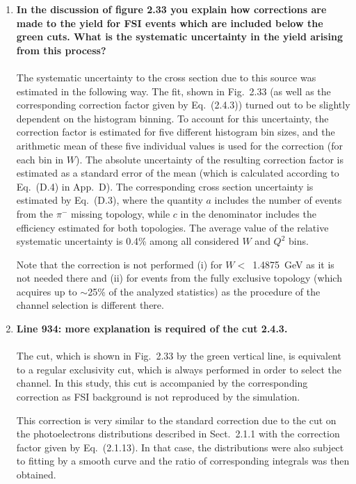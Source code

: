 \documentclass[,superscriptaddress,showpacs,amssymb,amsmath,amsfonts,linenumbers,article]{revtex4-1}
\begin{document}
\begin{enumerate}[label=\textbf{\arabic*}.]
\item {\bf In the discussion of figure 2.33 you explain how corrections are made to the yield for FSI events which are included below the green cuts. What is the systematic uncertainty in the yield arising from this process?}\\ \\
The systematic uncertainty to the cross section due to this source was estimated in the following way. The fit, shown in Fig.~2.33 (as well as the corresponding correction factor given by Eq.~(2.4.3)) turned out to be slightly dependent on the histogram binning. To account for this uncertainty, the correction factor is estimated for five different histogram bin sizes, and the arithmetic mean of these five individual values is used for the correction (for each bin in $W$). The absolute uncertainty of the resulting correction factor is estimated as a standard error of the mean (which is calculated according to Eq.~(D.4) in App.~D). The corresponding cross section uncertainty is estimated by Eq.~(D.3), where the quantity $a$ includes the number of events from the $\pi^{-}$ missing topology, while $c$ in the denominator includes the efficiency estimated for both topologies. The average value of the relative systematic uncertainty is 0.4\% among all considered $W$ and $Q^{2}$ bins.

Note that the correction is not performed (i) for $W<$~1.4875~GeV as it is not needed there and (ii) for events from the fully exclusive topology (which acquires up to $\sim$25\% of the analyzed statistics) as the procedure of the channel selection is different there. 

\item {\bf Line 934: more explanation is required of the cut 2.4.3.}\\ \\
The cut, which is shown in Fig.~2.33 by the green vertical line, is equivalent to a regular exclusivity cut, which is always performed in order to select the channel. In this study, this cut is accompanied by the corresponding correction as FSI background is not reproduced by the simulation.


This correction is very similar to the standard correction due to the cut on the photoelectrons distributions described in Sect.~2.1.1 with the correction factor given by Eq.~(2.1.13). In that case, the distributions were also subject to fitting by a smooth curve and the ratio of corresponding integrals was then obtained. 


\end{enumerate}
\end{document}
